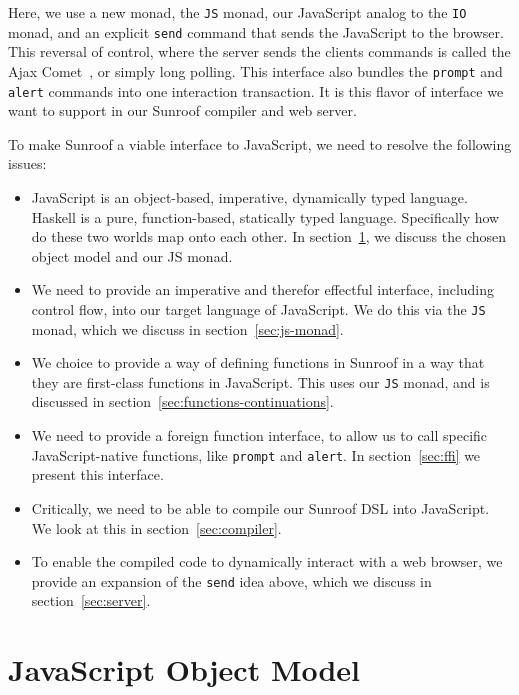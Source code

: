 \documentclass{llncs}
\newcommand{\Src}[1]{{\tt{#1}}}
\begin{document}
Here, we use a new monad, the \Src{JS} monad, our JavaScript
analog to the \Src{IO} monad,
and an explicit \Src{send} command that sends the JavaScript to the browser.
This reversal of control, where the
server sends the clients commands is called the Ajax Comet~\cite{..},
or simply long polling.
This interface also bundles the \Src{prompt} and \Src{alert} commands
into one interaction transaction.
It is this flavor of interface we want to support in our Sunroof compiler
and web server.  

To make Sunroof a viable interface to JavaScript, we need to
resolve the following issues:
\begin{itemize}
\item JavaScript is an object-based, imperative, dynamically typed language.
Haskell is a pure, function-based, statically typed language.
Specifically how do these two worlds map onto each other.
In section~\ref{sec:object-model}, we discuss the chosen object model
and our JS monad.
%
\item We need to provide an imperative and therefor effectful interface,
including control flow, into our target language of JavaScript.
We do this via the \Src{JS} monad, which we discuss
in section~\ref{sec:js-monad}.
\item We choice to provide a way of defining functions
in Sunroof in a way that they are first-class functions
in JavaScript. This uses our \Src{JS} monad, and
is discussed in section~\ref{sec:functions-continuations}.
%
\item We need to provide a foreign function interface,
to allow us to call specific JavaScript-native functions,
like \Src{prompt} and \Src{alert}.
In section~\ref{sec:ffi} we present this interface.
%
\item Critically, we need to be able to compile our Sunroof DSL
into JavaScript. We look at this in section~\ref{sec:compiler}.
\item To enable the compiled code to dynamically interact with
a web browser, we provide an expansion of the \Src{send} idea above,
which we discuss in section~\ref{sec:server}.
\end{itemize}



\section{JavaScript Object Model}
\label{sec:object-model}
\end{document}
